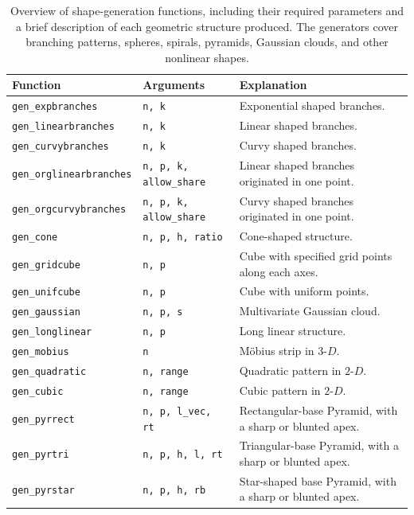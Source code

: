 \begin{table}

\caption{\label{tab:shape-tb-pdf}Overview of shape-generation functions, including their required parameters and a brief description of each geometric structure produced. The generators cover branching patterns, spheres, spirals, pyramids, Gaussian clouds, and other nonlinear shapes.}
\centering
\begin{tabular}[t]{>{\raggedright\arraybackslash}p{3.5cm}>{\raggedright\arraybackslash}p{1.5cm}>{\raggedright\arraybackslash}p{8cm}}
\toprule
Function & Arguments & Explanation\\
\midrule
\texttt{gen\_expbranches} & \texttt{n, k} & Exponential shaped branches.\\
\texttt{gen\_linearbranches} & \texttt{n, k} & Linear shaped branches.\\
\texttt{gen\_curvybranches} & \texttt{n, k} & Curvy shaped branches.\\
\texttt{gen\_orglinearbranches} & \texttt{n, p, k, allow\_share} & Linear shaped branches originated in one point.\\
\texttt{gen\_orgcurvybranches} & \texttt{n, p, k, allow\_share} & Curvy shaped branches originated in one point.\\
\texttt{gen\_cone} & \texttt{n, p, h, ratio} & Cone-shaped structure.\\
\texttt{gen\_gridcube} & \texttt{n, p} & Cube with specified grid points along each axes.\\
\texttt{gen\_unifcube} & \texttt{n, p} & Cube with uniform points.\\
\texttt{gen\_gaussian} & \texttt{n, p, s} & Multivariate Gaussian cloud.\\
\texttt{gen\_longlinear} & \texttt{n, p} & Long linear structure.\\
\texttt{gen\_mobius} & \texttt{n} & Möbius strip in $3\text{-}D$.\\
\texttt{gen\_quadratic} & \texttt{n, range} & Quadratic pattern in $2\text{-}D$.\\
\texttt{gen\_cubic} & \texttt{n, range} & Cubic pattern in $2\text{-}D$.\\
\texttt{gen\_pyrrect} & \texttt{n, p, l\_vec, rt} & Rectangular-base Pyramid, with a sharp or blunted apex.\\
\texttt{gen\_pyrtri} & \texttt{n, p, h, l, rt} & Triangular-base Pyramid, with a sharp or blunted apex.\\
\texttt{gen\_pyrstar} & \texttt{n, p, h, rb} & Star-shaped base Pyramid, with a sharp or blunted apex.\\

\end{tabular}
\end{table}
